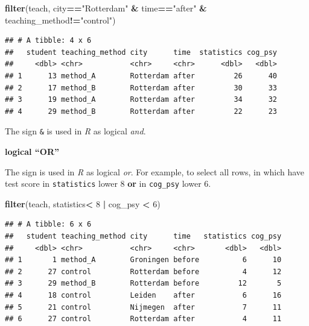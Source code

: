\documentclass[
]{scrartcl}
\newenvironment{Shaded}{\begin{snugshade}}{\end{snugshade}}
\newcommand{\DecValTok}[1]{\textcolor[rgb]{0.00,0.00,0.81}{#1}}
\newcommand{\KeywordTok}[1]{\textcolor[rgb]{0.13,0.29,0.53}{\textbf{#1}}}
\newcommand{\NormalTok}[1]{#1}
\newcommand{\OperatorTok}[1]{\textcolor[rgb]{0.81,0.36,0.00}{\textbf{#1}}}
\newcommand{\StringTok}[1]{\textcolor[rgb]{0.31,0.60,0.02}{#1}}
\begin{document}
\begin{Shaded}
\begin{Highlighting}[]
\KeywordTok{filter}\NormalTok{(teach, city}\OperatorTok{==}\StringTok{"Rotterdam"} \OperatorTok{\&}\StringTok{ }\NormalTok{time}\OperatorTok{==}\StringTok{"after"} \OperatorTok{\&}\StringTok{ }\NormalTok{teaching\_method}\OperatorTok{!=}\StringTok{"control"}\NormalTok{)}
\end{Highlighting}
\end{Shaded}

\begin{verbatim}
## # A tibble: 4 x 6
##   student teaching_method city      time  statistics cog_psy
##     <dbl> <chr>           <chr>     <chr>      <dbl>   <dbl>
## 1      13 method_A        Rotterdam after         26      40
## 2      17 method_B        Rotterdam after         30      33
## 3      19 method_A        Rotterdam after         34      32
## 4      29 method_B        Rotterdam after         22      23
\end{verbatim}

The sign \texttt{\&} is used in \emph{R} as logical \emph{and}.

\textbf{logical ``OR''}

The sign \texttt{\textbar{}} is used in \emph{R} as logical \emph{or}. For example, to select all rows, in which have test score in \texttt{statistics} lower 8 \textbf{or} in \texttt{cog\_psy} lower 6.

\begin{Shaded}
\begin{Highlighting}[]
\KeywordTok{filter}\NormalTok{(teach, statistics}\OperatorTok{\textless{}}\StringTok{ }\DecValTok{8} \OperatorTok{|}\StringTok{ }\NormalTok{cog\_psy }\OperatorTok{\textless{}}\StringTok{ }\DecValTok{6}\NormalTok{)}
\end{Highlighting}
\end{Shaded}

\begin{verbatim}
## # A tibble: 6 x 6
##   student teaching_method city      time   statistics cog_psy
##     <dbl> <chr>           <chr>     <chr>       <dbl>   <dbl>
## 1       1 method_A        Groningen before          6      10
## 2      27 control         Rotterdam before          4      12
## 3      29 method_B        Rotterdam before         12       5
## 4      18 control         Leiden    after           6      16
## 5      21 control         Nijmegen  after           7      11
## 6      27 control         Rotterdam after           4      11
\end{verbatim}
\end{document}
